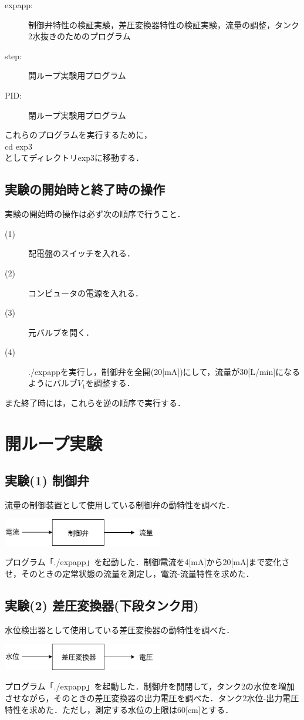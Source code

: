 \documentclass[12pt]{jsarticle}
\begin{document}
\setcounter{page}{1}
\begin{description}
  \item[expapp:]制御弁特性の検証実験，差圧変換器特性の検証実験，流量の調整，タンク2水抜きのためのプログラム
  \item[step:]開ループ実験用プログラム
  \item[PID:]閉ループ実験用プログラム
\end{description}

これらのプログラムを実行するために，\\
cd exp3\\
としてディレクトリexp3に移動する．
\subsection{実験の開始時と終了時の操作}
実験の開始時の操作は必ず次の順序で行うこと．

\begin{description}
  \item[(1)] 配電盤のスイッチを入れる．
  \item[(2)] コンピュータの電源を入れる．
  \item[(3)] 元バルブを開く．
  \item[(4)] ./expappを実行し，制御弁を全開(20[mA])にして，流量が30[L/min]になるようにバルブ$V_1$を調整する．
\end{description}

また終了時には，これらを逆の順序で実行する．

\section{開ループ実験}
\subsection{実験(1) 制御弁}
流量の制御装置として使用している制御弁の動特性を調べた．
\begin{center}
  \includegraphics[clip,width=7.0cm]{../img/A_Q_transform.png}
\end{center}
プログラム「./expapp」を起動した．制御電流を4[mA]から20[mA]まで変化させ，そのときの定常状態の流量を測定し，電流-流量特性を求めた．
\subsection{実験(2) 差圧変換器(下段タンク用)}
水位検出器として使用している差圧変換器の動特性を調べた．
\begin{center}
  \includegraphics[clip,width=7.0cm]{../img/H_V_transform.png}
\end{center}
プログラム「./expapp」を起動した．制御弁を開閉して，タンク2の水位を増加させながら，そのときの差圧変換器の出力電圧を調べた．タンク2水位-出力電圧特性を求めた．ただし，測定する水位の上限は60[cm]とする．
\end{document}
